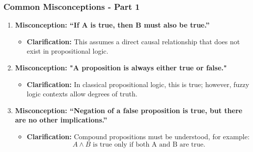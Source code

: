 \documentclass[aspectratio=169]{beamer}
\begin{document}
\begin{frame}[fragile]
    \frametitle{Common Misconceptions - Part 1}
    \begin{enumerate}
        \item \textbf{Misconception: “If A is true, then B must also be true.”}
        \begin{itemize}
            \item \textbf{Clarification:} This assumes a direct causal relationship that does not exist in propositional logic.
        \end{itemize}
        
        \item \textbf{Misconception: "A proposition is always either true or false."}
        \begin{itemize}
            \item \textbf{Clarification:} In classical propositional logic, this is true; however, fuzzy logic contexts allow degrees of truth.
        \end{itemize}
        
        \item \textbf{Misconception: “Negation of a false proposition is true, but there are no other implications.”}
        \begin{itemize}
            \item \textbf{Clarification:} Compound propositions must be understood, for example:
            \begin{equation}
                A \land B \text{ is true only if both A and B are true.}
            \end{equation}
        \end{itemize}
    \end{enumerate}
\end{frame}
\end{document}
